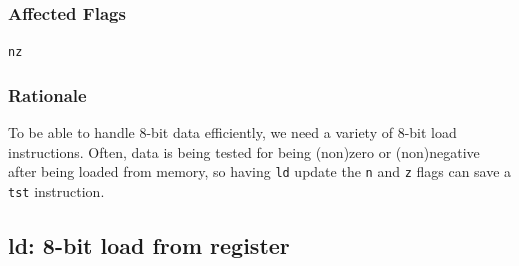 \documentclass{book}
\begin{document}
\subsubsection*{Affected Flags}

\texttt{nz}

\subsubsection*{Rationale}

To be able to handle 8-bit data efficiently, we need a variety of 8-bit load instructions. Often, data is being tested for being (non)zero or (non)negative after being loaded from memory, so having \texttt{ld} update the \texttt{n} and \texttt{z} flags can save a \texttt{tst} instruction.


\subsection{ld: 8-bit load from register}
\end{document}
